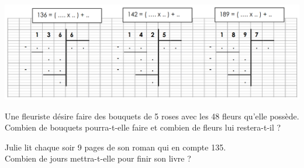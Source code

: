 \documentclass[11pt]{article}
\begin{document}
\begin{exercicedevoir}
\includegraphics[width=\linewidth]{.data/DIVISION-2.png}
\end{exercicedevoir}

\begin{exercicedevoir}
Une fleuriste désire faire des bouquets de 5 roses avec les 48 fleurs qu’elle
possède. \\
Combien de bouquets pourra-t-elle faire et combien de fleurs lui
restera-t-il ?
\end{exercicedevoir}
\encart{5cm}

\begin{exercicedevoir}
Julie lit chaque soir 9 pages de son roman qui en compte 135.\\
Combien de jours mettra-t-elle pour finir son livre ?
\end{exercicedevoir}
\encart{5cm}
\end{document}
